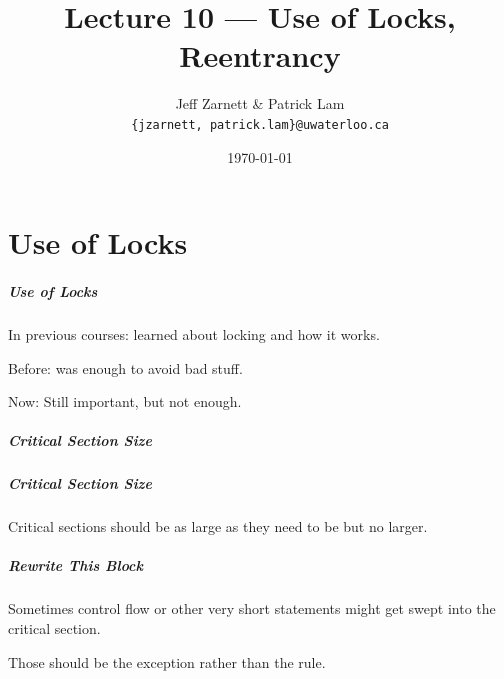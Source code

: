 
\usepackage{multirow}

\title{Lecture 10 --- Use of Locks, Reentrancy}

\author{Jeff Zarnett \& Patrick Lam \\ \small \texttt{\{jzarnett, patrick.lam\}@uwaterloo.ca}}
\date{\today}




\begin{frame}
  \titlepage

 \end{frame}


\part{Use of Locks}
\frame{\partpage}


\begin{frame}
\frametitle{Use of Locks}

\vspace*{-3em}
In previous courses: learned about locking and how it works.

Before: was enough to avoid bad stuff.

Now: Still important, but not enough.


\end{frame}


\begin{frame}
\frametitle{Critical Section Size}

  \begin{center}
    
  \end{center}

\end{frame}

\begin{frame}
\frametitle{Critical Section Size}

  \begin{center}
    
  \end{center}

Critical sections should be as large as they need to be but no larger. 

\end{frame}


\begin{frame}
\frametitle{Rewrite This Block}

  \begin{center}
    
  \end{center}

Sometimes control flow or other very short statements might get swept into the critical section.

Those should be the exception rather than the rule.

\end{frame}


